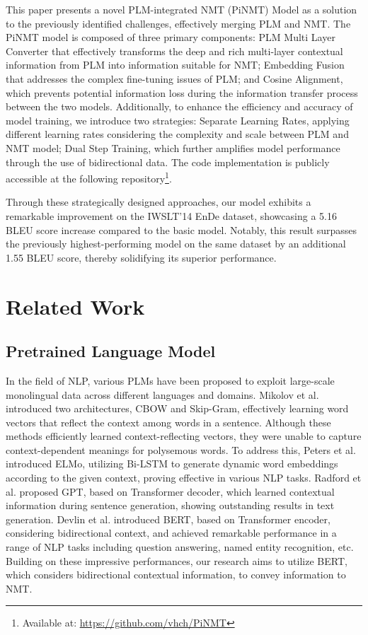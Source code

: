 \documentclass[conference]{IEEEtran}
\begin{document}
This paper presents a novel PLM-integrated NMT (PiNMT) Model as a solution to the previously identified challenges, effectively merging PLM and NMT. The PiNMT model is composed of three primary components: PLM Multi Layer Converter that effectively transforms the deep and rich multi-layer contextual information from PLM into information suitable for NMT; Embedding Fusion that addresses the complex fine-tuning issues of PLM; and Cosine Alignment, which prevents potential information loss during the information transfer process between the two models. 
Additionally, to enhance the efficiency and accuracy of model training, we introduce two strategies: Separate Learning Rates, applying different learning rates considering the complexity and scale between PLM and NMT model; Dual Step Training, which further amplifies model performance through the use of bidirectional data. The code implementation is publicly accessible at the following repository\footnote{Available at: \url{https://github.com/vhch/PiNMT}}.

Through these strategically designed approaches, our model exhibits a remarkable improvement on the IWSLT'14 EnDe dataset, showcasing a 5.16 BLEU score increase compared to the basic model. Notably, this result surpasses the previously highest-performing model on the same dataset by an additional 1.55 BLEU score, thereby solidifying its superior performance.












\section{Related Work}
\subsection{Pretrained Language Model}
In the field of NLP, various PLMs have been proposed to exploit large-scale monolingual data across different languages and domains. Mikolov et al. \cite{Mikolov2013} introduced two architectures, CBOW and Skip-Gram, effectively learning word vectors that reflect the context among words in a sentence. Although these methods efficiently learned context-reflecting vectors, they were unable to capture context-dependent meanings for polysemous words. To address this, Peters et al. \cite{peters2018elmo} introduced ELMo, utilizing Bi-LSTM to generate dynamic word embeddings according to the given context, proving effective in various NLP tasks. Radford et al. \cite{radford2018gpt} proposed GPT, based on Transformer decoder, which learned contextual information during sentence generation, showing outstanding results in text generation. Devlin et al. \cite{devlin2019bert} introduced BERT, based on Transformer encoder, considering bidirectional context, and achieved remarkable performance in a range of NLP tasks including question answering, named entity recognition, etc. Building on these impressive performances, our research aims to utilize BERT, which considers bidirectional contextual information, to convey information to NMT.
\end{document}
